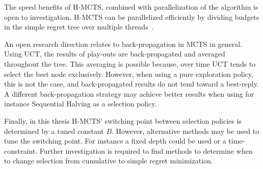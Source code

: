 \documentclass{kecsmstr}
\begin{document}
The speed benefits of H-MCTS, combined with parallelization of the algorithm is open to investigation. H-MCTS can be parallelized efficiently by dividing budgets in the simple regret tree over multiple threads~.

An open research direction relates to back-propagation in MCTS in general. Using UCT, the results of play-outs are back-propagated and averaged throughout the tree. This averaging is possible because, over time UCT tends to select the best node exclusively. However, when using a pure exploration policy, this is not the case, and back-propagated results do not tend toward a best-reply. A different back-propagation strategy may achieve better results when using for instance Sequential Halving as a selection policy.

Finally, in this thesis H-MCTS' switching point between selection policies is determined by a tuned constant $B$. However, alternative methods may be used to tune the switching point. For instance a fixed depth could be used or a time-constraint. Further investigation is required to find methods to determine when to change selection from cumulative to simple regret minimization.

 \emptypage
\end{document}
